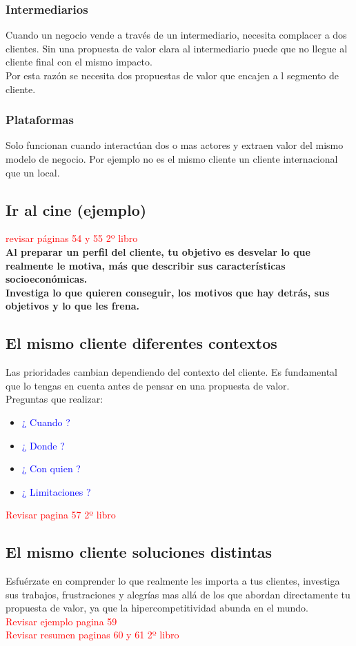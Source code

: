 \documentclass[11pt]{book}
\begin{document}
\subsubsection{Intermediarios}
Cuando un negocio vende a través de un intermediario, necesita complacer a dos clientes. Sin una propuesta de valor clara al intermediario puede que no llegue al cliente final con el mismo impacto.\\
Por esta razón se necesita dos propuestas de valor que encajen a l segmento de cliente.
\subsubsection{Plataformas}
Solo funcionan cuando interactúan dos o mas actores y extraen valor del mismo modelo de negocio. Por ejemplo no es el mismo cliente un cliente internacional que un local.
\subsection{Ir al cine (ejemplo)}
\textcolor{red}{revisar páginas 54 y 55 2º libro}\\
\textbf{Al preparar un perfil del cliente, tu objetivo es desvelar lo que realmente le motiva, más que describir sus características socioeconómicas.\\ Investiga lo que quieren conseguir, los motivos que hay detrás, sus objetivos y lo que les frena.}
\subsection{El mismo cliente diferentes contextos}
Las prioridades cambian dependiendo del contexto del cliente. Es fundamental que lo tengas en cuenta antes de pensar en una propuesta de valor.\\
Preguntas que realizar:
\begin{itemize}
\item \textcolor{blue}{¿ Cuando ?}
\item \textcolor{blue}{¿ Donde ?}
\item \textcolor{blue}{¿ Con quien ?}
\item \textcolor{blue}{¿ Limitaciones ?}
\end{itemize}
\textcolor{red}{Revisar pagina 57 2º libro}
\subsection{El mismo cliente soluciones distintas}
Esfuérzate en comprender lo que realmente les importa a tus clientes, investiga sus trabajos, frustraciones y alegrías mas allá de los que abordan directamente tu propuesta de valor, ya que la hipercompetitividad abunda en el mundo.\\
\textcolor{red}{Revisar ejemplo pagina 59}\\
\textcolor{red}{Revisar resumen paginas 60 y 61 2º libro}
\end{document}
